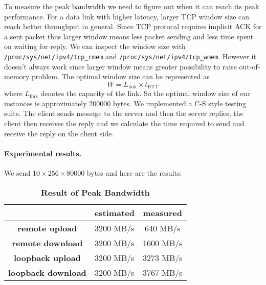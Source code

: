 To measure the peak bandwidth we need to figure out when it can reach its peak performance. For a data link with higher latency, larger TCP window size can reach better throughput in general. Since TCP protocal requires implicit ACK for a sent packet thus larger window means less packet sending and less time spent on waiting for reply. We can inspect the window size with \texttt{/proc/sys/net/ipv4/tcp\_rmem} and \texttt{/proc/sys/net/ipv4/tcp\_wmem}. However it doesn't always work since larger window means greater possibility to raise out-of-memory problem. The optimal window size can be represented as
\begin{equation}
W=L_{\text{link}} \times t_{\text{RTT}}
\end{equation}
where $L_{\text{link}}$ denotes the capacity of the link. So the optimal window size of our instances is approximately $200000$ bytes. We implemented a C-S style testing suite. The client sends message to the server and then the server replies, the client then receives the reply and we calculate the time required to send and receive the reply on the client side.

\paragraph{Experimental results.}
We send $10 \times 256 \times 80000$ bytes and here are the results:

\begin{table}[h]
	\centering
	\begin{tabular}{c|c|c}
		\hline
		\makecell{Type} & estimated & measured\\ \hline
        \textbf{remote upload} & 3200 MB/s & 640 MB/s \\ \hline
        \textbf{remote download} & 3200 MB/s & 1600 MB/s  \\ \hline
		\textbf{loopback upload} & 3200 MB/s & 3273 MB/s  \\ \hline
		\textbf{loopback download} & 3200 MB/s & 3767 MB/s  \\ \hline
	\end{tabular}
	\caption{\textbf{Result of Peak Bandwidth}}
	\label{table:peak-band}
\end{table}

